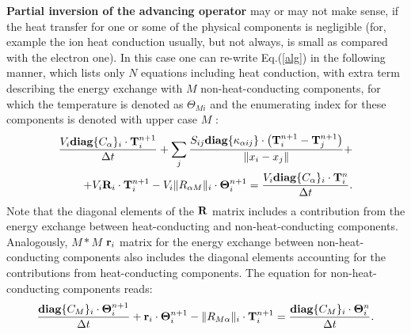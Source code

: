 {\bf Partial inversion of the advancing operator} may or may not make sense, if the heat transfer for one or some of the physical components is negligible (for, example 
the ion heat conduction usually, but not always, is small as compared with the electron one).  In this case one can re-write Eq.(\ref{alg}) in the following manner, which
lists only $N$ equations including heat conduction, with extra term describing the energy exchange with $M$ non-heat-conducting components, for which the
temperature is denoted as $\Theta_{Mi}$ and the enumerating index for these components is denoted with upper case $M$ :
\begin{eqnarray}
\frac{V_i{\bf diag}\{C_\alpha\}_i
\cdot{\bf T}^{n+1}_i}{\Delta t}+\sum_j{\frac{S_{ij}
{\bf diag}\{\kappa_{\alpha ij}\}\cdot
\left({\bf T}^{n+1}_i-{\bf T}^{n+1}_j\right)}{\|x_i-x_j\|}}+\nonumber\\
+V_i{\bf R}_i\cdot {\bf T}^{n+1}_i %
-  V_i\|R_{\alpha M}\|_i\cdot{\bf \Theta}_i^{n+1}
=\frac{V_i{\bf diag}\{C_\alpha\}_i\cdot{\bf T}^{n}_i}{\Delta t}.\label{NM}
\end{eqnarray}
Note that the diagonal elements of the ${\bf R}$ matrix includes a 
contribution from the energy exchange between heat-conducting and non-heat-conducting components. Analogously, 
$M*M$ ${\bf r}_i$ matrix for the
energy exchange between non-heat-conducting components also includes the diagonal elements accounting for the contributions from heat-conducting components. 
The equation  for non-heat-conducting components reads:
\begin{equation}
\frac{{\bf diag}\{C_M\}_i
\cdot{\bf \Theta}^{n+1}_i}{\Delta t}+
{\bf r}_i\cdot {\bf \Theta}^{n+1}_i %
-  \|R_{ M \alpha}\|_i\cdot{\bf T}_i^{n+1}
=\frac{{\bf diag}\{C_M\}_i\cdot{\bf \Theta}^{n}_i}{\Delta t}.\label{MN}
\end{equation}

